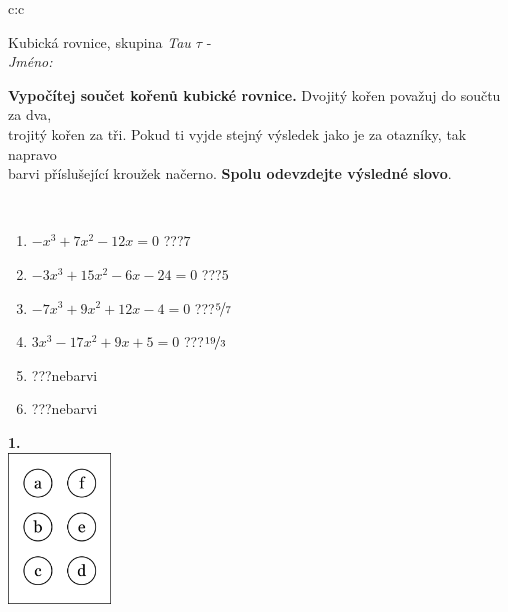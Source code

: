 \documentclass[10pt]{report}
\begin{document}
\begin{tabular}{c:c}
\begin{minipage}[c][104.5mm][t]{0.5\linewidth}
\begin{center}
\vspace{7mm}
{\huge Kubická rovnice, skupina \textit{Tau $\tau$} -}\\[5mm]
\textit{Jméno:}\phantom{xxxxxxxxxxxxxxxxxxxxxxxxxxxxxxxxxxxxxxxxxxxxxxxxxxxxxxxxxxxxxxxxx}\\[5mm]
\begin{minipage}{0.95\linewidth}
\begin{center}
\textbf{Vypočítej součet kořenů kubické rovnice.} Dvojitý kořen považuj do součtu za dva,\\trojitý kořen za tři. Pokud ti vyjde stejný výsledek jako je za otazníky, tak napravo\\barvi příslušející kroužek načerno. \textbf{Spolu odevzdejte výsledné slovo}.
\end{center}
\end{minipage}
\\[1mm]
\begin{minipage}{0.79\linewidth}
\begin{center}
\begin{varwidth}{\linewidth}
\begin{enumerate}
\Large
\item $-x^3+7x^2-12x=0$\quad \dotfill\; ???\;\dotfill \quad $7$
\item $-3x^3+15x^2-6x-24=0$\quad \dotfill\; ???\;\dotfill \quad $5$
\item $-7x^3+9x^2+12x-4=0$\quad \dotfill\; ???\;\dotfill \quad $\nicefrac{5}{7}$
\item $3x^3-17x^2+9x+5=0$\quad \dotfill\; ???\;\dotfill \quad $\nicefrac{19}{3}$
\item \quad \dotfill\; ???\;\dotfill \quad nebarvi
\item \quad \dotfill\; ???\;\dotfill \quad nebarvi
\end{enumerate}
\end{varwidth}
\end{center}
\end{minipage}
\begin{minipage}{0.20\linewidth}
\begin{center}
{\Huge\bfseries 1.} \\[2mm]
\includegraphics[height=40mm]{../images/braille.png}

\end{center}
\end{minipage}
\end{center}
\end{minipage}
\end{tabular}
\end{document}
